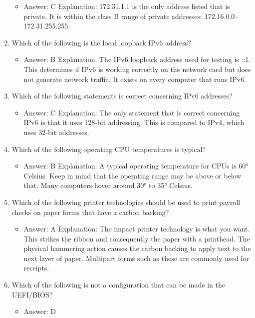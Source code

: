 \documentclass{article}
\begin{document}
\begin{enumerate}
\begin{itemize}
        \item Answer: C
Explanation: 172.31.1.1 is the only address listed that is private. It is within the class B
range of private addresses: 172.16.0.0–172.31.255.255.
    \end{itemize}
    \item Which of the following is the local loopback IPv6 address?
    \begin{itemize}
        \item Answer: B
Explanation: The IPv6 loopback address used for testing is ::1. This determines if IPv6
is working correctly on the network card but does not generate network traffic. It exists
on every computer that runs IPv6.
    \end{itemize}
    \item Which of the following statements is correct concerning
IPv6 addresses?
    \begin{itemize}
        \item Answer: C
Explanation: The only statement that is correct concerning IPv6 is that it uses 128-bit
addressing. This is compared to IPv4, which uses 32-bit addresses.
    \end{itemize}
    \item Which of the following operating CPU temperatures is typical?
    \begin{itemize}
        \item Answer: B
Explanation: A typical operating temperature for CPUs is 60° Celsius. Keep in mind
that the operating range may be above or below that. Many computers hover around
30° to 35° Celsius.
    \end{itemize}
    \item Which of the following printer technologies should be used to print
payroll checks on paper forms that have a carbon backing?
    \begin{itemize}
        \item Answer: A
Explanation: The impact printer technology is what you want. This strikes the ribbon
and consequently the paper with a printhead. The physical hammering action causes
the carbon backing to apply text to the next layer of paper. Multipart forms such as
these are commonly used for receipts.
    \end{itemize}
    \item Which of the following is not a configuration that can be made in
the UEFI/BIOS?
    \begin{itemize}
        \item Answer: D

\end{itemize}
\end{enumerate}
\end{document}
